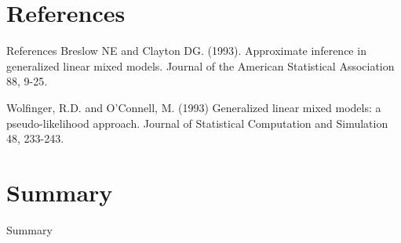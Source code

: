 \documentclass[
  9pt,
  ignorenonframetext,
]{beamer}
\begin{document}
\hypertarget{references}{%
\section{References}\label{references}}

\begin{frame}{References}
\protect\hypertarget{references-1}{}
Breslow NE and Clayton DG. (1993). Approximate inference in generalized
linear mixed models. Journal of the American Statistical Association 88,
9-25.

Wolfinger, R.D. and O'Connell, M. (1993) Generalized linear mixed
models: a pseudo-likelihood approach. Journal of Statistical Computation
and Simulation 48, 233-243.
\end{frame}

\hypertarget{summary}{%
\section{Summary}\label{summary}}

\begin{frame}{Summary}
\protect\hypertarget{summary-1}{}
\end{frame}
\end{document}
